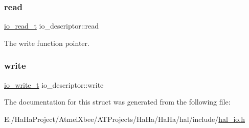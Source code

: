 \subsubsection{\texorpdfstring{read}{read}}
{\footnotesize\ttfamily \hyperlink{group__doc__driver__hal__helper__io_ga4d9ae58de2887289fe09eac6f0aa8be7}{io\+\_\+read\+\_\+t} io\+\_\+descriptor\+::read}

The write function pointer. \mbox{\label{structio__descriptor_a962235264b6c73e3ab712acb64022194}} 
\subsubsection{\texorpdfstring{write}{write}}
{\footnotesize\ttfamily \hyperlink{group__doc__driver__hal__helper__io_gacb03c48993a6786f00946c196c40add1}{io\+\_\+write\+\_\+t} io\+\_\+descriptor\+::write}



The documentation for this struct was generated from the following file\+:\begin{DoxyCompactItemize}
\item 
E\+:/\+Ha\+Ha\+Project/\+Atmel\+Xbee/\+A\+T\+Projects/\+Ha\+Ha/\+Ha\+Ha/hal/include/\hyperlink{hal__io_8h}{hal\+\_\+io.\+h}\end{DoxyCompactItemize}
